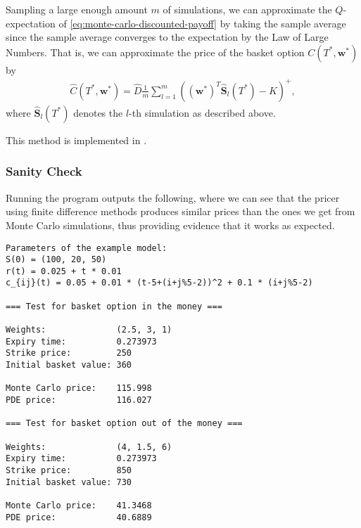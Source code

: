 \documentclass[english]{article}
\newcommand{\comment}[1]{\color{blue}#1\color{black}}
\numberwithin{equation}{section}
\numberwithin{figure}{section}
\theoremstyle{bolddescit}
\theoremstyle{definition}
\theoremstyle{definition}
\theoremstyle{plain}
\theoremstyle{plain}
\theoremstyle{bolddesc}
\theoremstyle{plain}
\theoremstyle{remark}
\begin{document}
Sampling a large enough amount $m$ of simulations, we can approximate the $Q$-expectation of \eqref{eq:monte-carlo-discounted-payoff} by taking the sample average since the sample average converges to the expectation by the Law of Large Numbers. That is, we can approximate the price of the basket option $C(T^*,\mathbf{w}^*)$ by
\begin{align*}
  \hat{C}(T^*,\mathbf{w}^*) = \hat{D} \frac{1}{m} \sum_{l=1}^{m} ((\mathbf{w}^*)^T \hat{\mathbf{S}}_l(T^*) - K)^+,
\end{align*}
where $\hat{\mathbf{S}}_l(T^*)$ denotes the $l$-th simulation as described above.

This method is implemented in .

\subsubsection{Sanity Check}

Running the program outputs the following, where we can see that the pricer using finite difference methods produces similar prices than the ones we get from Monte Carlo simulations, thus providing evidence that it works as expected.


{\small
\begin{verbatim}
Parameters of the example model:
S(0) = (100, 20, 50)
r(t) = 0.025 + t * 0.01
c_{ij}(t) = 0.05 + 0.01 * (t-5+(i+j%5-2))^2 + 0.1 * (i+j%5-2)

=== Test for basket option in the money ===

Weights:              (2.5, 3, 1)
Expiry time:          0.273973
Strike price:         250
Initial basket value: 360

Monte Carlo price:    115.998
PDE price:            116.027

=== Test for basket option out of the money ===

Weights:              (4, 1.5, 6)
Expiry time:          0.273973
Strike price:         850
Initial basket value: 730

Monte Carlo price:    41.3468
PDE price:            40.6889
\end{verbatim}
}

\end{document}
